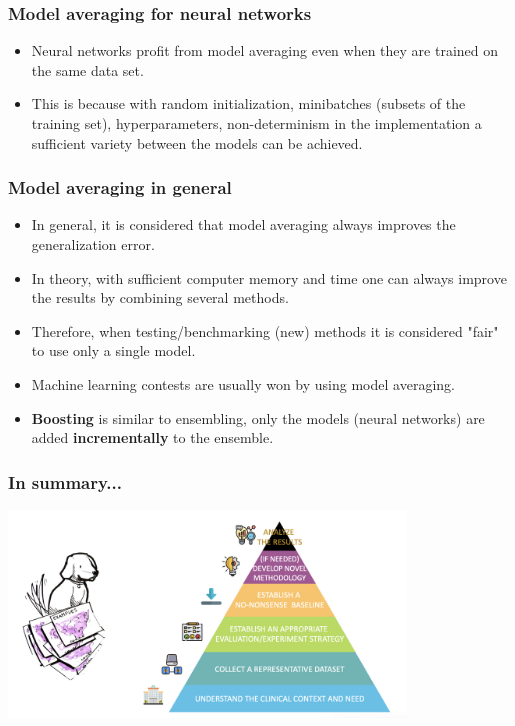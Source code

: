 \documentclass[notes]{beamer}          %
\begin{document}
\begin{frame}
\frametitle{Model averaging for neural networks}
    \begin{itemize}
        \item Neural networks profit from model averaging even when they are trained on the same data set.
        \item This is because with random initialization, minibatches (subsets of the training set), hyperparameters, non-determinism in the implementation a sufficient variety between the models can be achieved.
    \end{itemize}
\end{frame}


\begin{frame}
\frametitle{Model averaging in general}
    \begin{itemize}
        \item In general, it is considered that model averaging always improves the generalization error.
        \item In theory, with sufficient computer memory and time one can always improve the results by combining several methods.
        \item Therefore, when testing/benchmarking (new) methods it is considered "fair" to use only a single model.
        \item Machine learning contests are usually won by using model averaging.
        \item {\bf Boosting} is similar to ensembling, only the models (neural networks) are added {\bf incrementally} to the ensemble.
    \end{itemize}
\end{frame}

\fi %

\begin{frame}
\frametitle{In summary...}
\begin{center}
\includegraphics[height=5.5cm]{../figures/intro/pyramid.png}
\end{center}
\end{frame}
\end{document}
